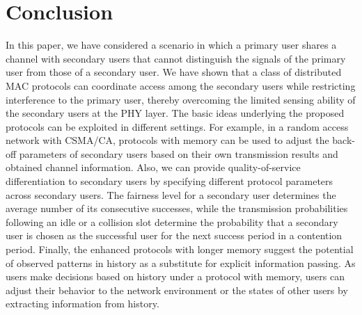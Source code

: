 \documentclass[12pt,draftclsnofoot,onecolumn]{IEEEtran}
\begin{document}
\section{Conclusion}

In this paper, we have considered a scenario in which a primary user shares
a channel with secondary users that cannot distinguish the signals of the primary user
from those of a secondary user.
We have shown that a class of distributed MAC protocols can
coordinate access among the secondary users while restricting interference
to the primary user, thereby overcoming the limited sensing ability of the secondary users
at the PHY layer. The basic ideas underlying the proposed protocols
can be exploited in different settings. For example,
in a random access network with CSMA/CA, protocols with memory can be used to
adjust the back-off parameters of secondary users based on their own transmission results
and obtained channel information. Also, we can provide quality-of-service
differentiation to secondary users by specifying different protocol parameters across
secondary users.
The fairness level for a secondary user determines the average number
of its consecutive successes, while the transmission probabilities following
an idle or a collision slot determine the probability that a secondary user is chosen as
the successful user for the next success period in a contention period.
Finally, the enhanced protocols with longer memory suggest the potential of
observed patterns in history as a substitute for explicit information passing.
As users make decisions based on history under a protocol with memory,
users can adjust their behavior to the network environment or the states of other users
by extracting information from history.
\end{document}
